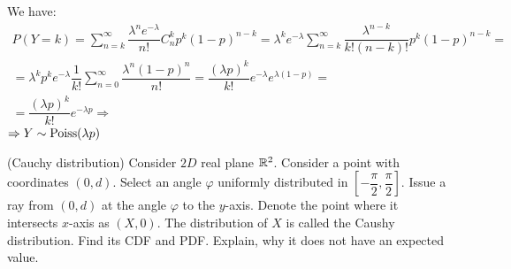 \documentclass[12pt]{report}
\begin{document}
\begin{solution}
    We have:
    \[
        \begin{array}{c}
            \displaystyle P(Y = k) = \sum\limits_{n=k}^\infty \dfrac{\lambda^n e^{-\lambda}}{n!} C_n^k p^k(1-p)^{n-k} = \lambda^k e^{-\lambda} \sum\limits_{n=k}^\infty  \dfrac{\lambda^{n-k}}{k!(n-k)!} p^k(1-p)^{n-k} = \\[0.5cm] 
            \displaystyle = \lambda^k p^k e^{-\lambda} \dfrac{1}{k!} \sum\limits_{n=0}^\infty \dfrac{\lambda^n (1-p)^n}{n!}  = \dfrac{(\lambda p)^k}{k!} e^{-\lambda} e^{\lambda (1 - p)} = \\
             \displaystyle =  \dfrac{(\lambda p)^k}{k!} e^{-\lambda p} \Longrightarrow         
        \end{array}
    \]
    $\Rightarrow Y \sim \operatorname{Poiss} (\lambda p)$
\end{solution}


    

\begin{problem}{(Cauchy distribution)}
    Consider $2D$ real plane $\mathbb{R}^2$. Consider a point with coordinates $(0, d)$. Select an angle $\varphi$ uniformly distributed in $\displaystyle \left[-\dfrac{\pi}{2}, \dfrac{\pi}{2}\right]$. Issue a ray from $(0, d)$ at the angle $\varphi$ to the $y$-axis. Denote the point where it intersects $x$-axis as $(X, 0)$. The distribution of $X$ is called the Caushy distribution. Find its CDF and PDF. Explain, why it does not have an expected value.
\end{problem}
\end{document}
